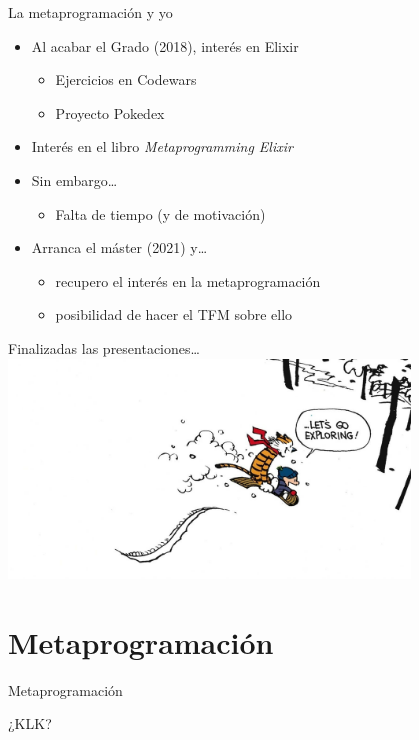 \documentclass[14pt,aspectratio=169]{beamer}
\begin{document}
\begin{frame}{La metaprogramación y yo}
  \begin{itemize}
    \item Al acabar el Grado (2018), interés en Elixir
    \begin{itemize}
      \item Ejercicios en Codewars
      \item Proyecto Pokedex
    \end{itemize}
    \item Interés en el libro \textit{Metaprogramming Elixir}
    \item Sin embargo\dots
    \begin{itemize}
      \item Falta de tiempo (y de motivación)
    \end{itemize}
    \item Arranca el máster (2021) y\dots
    \begin{itemize}
      \item recupero el interés en la metaprogramación
      \item posibilidad de hacer el TFM sobre ello
    \end{itemize}
  \end{itemize}
\end{frame}

\begin{frame}{Finalizadas las presentaciones\dots}
  \includegraphics[width=0.8\textwidth]{calvin-hobbes.jpg}
\end{frame}

\section{Metaprogramación}
\begin{frame}{Metaprogramación}
  \begin{center}
    \Huge ¿KLK?
    \end{center}
\end{frame}
\end{document}
